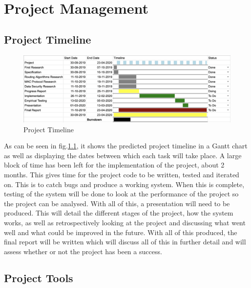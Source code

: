 \documentclass{report}
\begin{document}
\chapter{Project Management}

\section{Project Timeline}
\begin{figure}
    \centering
    \includegraphics[scale=0.35]{ProjectTimeline}
    \caption{Project Timeline}
    \label{fig:project-timeline}
\end{figure}
\bigskip

As can be seen in fig.\ref{fig:project-timeline}, it shows the predicted project timeline in a Gantt chart as well as displaying the dates between 
which each task will take place. A large block of time 
has been left for the implementation of the project, about 2 months. This gives time for the project code to be written, tested and iterated on. This is to catch bugs and produce a working system. When this is complete, testing of the system will be done to look at the performance of the project so the project can be analysed. With all of this, a presentation will need to be produced. This will detail the different stages of the project, how the system works, as well as retrospectively looking at the project and discussing what went well and what could be improved in the future. With all of this produced, the final report will be written which will discuss all of this in further detail and will assess whether or not the project has been a success. 

\section{Project Tools}
\end{document}
